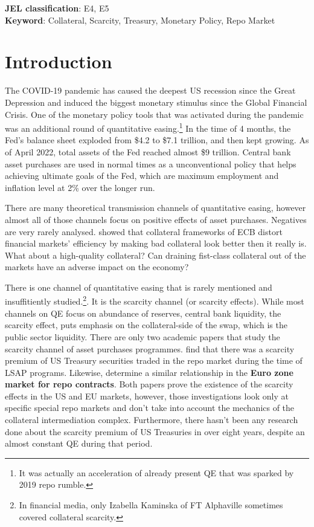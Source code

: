 \documentclass[11pt,a4paper,english,oneside]{article}
\begin{document}
\abstract{\lipsum[1]}

\begin{flushleft}
  \textbf{JEL classification}: E4, E5\\
  \textbf{Keyword}: Collateral, Scarcity, Treasury, Monetary Policy, Repo Market
\end{flushleft}

\section{Introduction} \label{sec:introduction} %

The COVID-19 pandemic has caused the deepest US recession since the Great Depression and induced the biggest monetary stimulus since the Global Financial Crisis. One of the monetary policy tools that was activated during the pandemic was an additional round of quantitative easing.\footnote{It was actually an acceleration of already present QE that was sparked by 2019 repo rumble.} In the time of 4 months, the Fed's balance sheet exploded from \$4.2 to \$7.1 trillion, and then kept growing. As of April 2022, total assets of the Fed reached almost \$9 trillion. Central bank asset purchases are used in normal times as a unconventional policy that helps achieving ultimate goals of the Fed, which are maximum employment and inflation level at 2\% over the longer run.

There are many theoretical transmission channels of quantitative easing, however almost all of those channels focus on positive effects of asset purchases. Negatives are very rarely analysed. \citet{nyborg2015} showed that collateral frameworks of ECB distort financial markets' efficiency by making bad collateral look better then it really is. What about a high-quality collateral? Can draining fist-class collateral out of the markets have an adverse impact on the economy?

There is one channel of quantitative easing that is rarely mentioned and insuffitiently studied.\footnote{In financial media, only Izabella Kaminska of FT Alphaville sometimes covered collateral scarcity.}. It is the scarcity channel (or scarcity effects). While most channels on QE focus on abundance of reserves, central bank liquidity, the scarcity effect, puts emphasis on the collateral-side of the swap, which is the public sector liquidity. There are only two academic papers that study the scarcity channel of asset purchases programmes. \citet{damico2014} find that there was a scarcity premium of US Treasury securities traded in the repo market during the time of LSAP programs. Likewise, \citet{arrata2018} determine a similar relationship in the \textbf{Euro zone market for repo contracts}. Both papers prove the existence of the scarcity effects in the US and EU markets, however, those investigations look only at specific special repo markets and don't take into account the mechanics of the collateral intermediation complex. Furthermore, there hasn't been any research done about the scarcity premium of US Treasuries in over eight years, despite an almost constant QE during that period.
\end{document}
